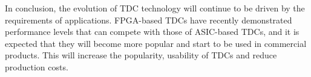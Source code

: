 In conclusion, the evolution of \gls{TDC} technology will continue to be driven by the requirements of applications. \gls{FPGA}-based \glspl{TDC} have recently demonstrated performance levels that can compete with those of \gls{ASIC}-based \glspl{TDC}, and it is expected that they will become more popular and start to be used in commercial products. This will increase the popularity, usability of \glspl{TDC} and reduce production costs.
